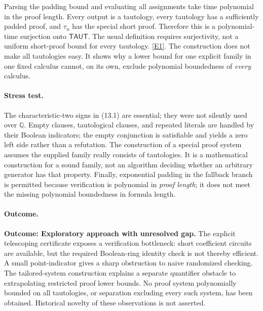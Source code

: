 \documentclass[11pt,a4paper]{article}
\newcommand{\Q}{\mathbb{Q}}
\newcommand{\eref}[2]{\hyperlink{extra:#1:#2}{[E#2]}}
\begin{document}
Parsing the padding bound and evaluating all assignments take time
polynomial in the proof length. Every output is a tautology, every
tautology has a sufficiently padded proof, and $\tau_n$ has the special
short proof. Therefore this is a polynomial-time surjection onto
$\mathsf{TAUT}$. The usual definition requires surjectivity, not a
uniform short-proof bound for every tautology. \eref{statement}{1}.
The construction does not make all tautologies easy. It shows why a
lower bound for one explicit family in one fixed calculus cannot, on
its own, exclude polynomial boundedness of \emph{every} calculus.

\paragraph{Stress test.}
The characteristic-two signs in (13.1) are essential; they were not
silently used over $\Q$. Empty clauses, tautological clauses, and repeated
literals are handled by their Boolean indicators; the empty conjunction
is satisfiable and yields a zero left side rather than a refutation.
The construction of a special proof system assumes the supplied family
really consists of tautologies. It is a mathematical construction for a
sound family, not an algorithm deciding whether an arbitrary generator
has that property. Finally, exponential padding in the fallback branch
is permitted because verification is polynomial in \emph{proof length};
it does not meet the missing polynomial boundedness in formula length.

\paragraph{Outcome.}
\textbf{Outcome: Exploratory approach with unresolved gap.}
The explicit telescoping certificate exposes a verification bottleneck:
short coefficient circuits are available, but the required Boolean-ring
identity check is not thereby efficient. A small point-indicator gives a
sharp obstruction to naive randomized checking. The tailored-system
construction explains a separate quantifier obstacle to extrapolating
restricted proof lower bounds. No proof system polynomially bounded on
all tautologies, or separation excluding every such system, has been
obtained. Historical novelty of these observations is not asserted.
\end{document}
